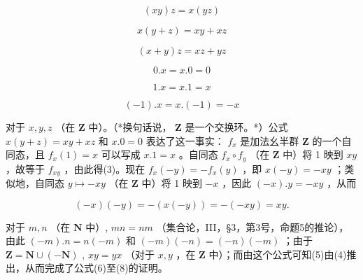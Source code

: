 \[
(x y) z = x (y z)\tag{3}
\]

\[
x (y + z) = x y + x z\tag{4}
\]

\[
(x + y) z = x z + y z\tag{5}
\]

\[
0. x = x. 0 = 0\tag{6}
\]

\[
1. x = x. 1 = x\tag{7}
\]

\[
(- 1). x = x. (- 1) = - x\tag{8}
\]

对于 \(x, y, z\) （在 \(\mathbf{Z}\) 中）。（*换句话说， \(\mathbf{Z}\) 是一个交换环。*）公式 \(x(y + z) = xy + xz\) 和 \(x.0 = 0\) 表达了这一事实： \(f_x\) 是加法幺半群 \(\mathbf{Z}\) 的一个自同态，且 \(f_{x}(1) = x\) 可以写成 \(x.1 = x\) 。自同态 \(f_{x} \circ f_{y}\) （在 \(\mathbf{Z}\) 中）将 1 映到 \(xy\) ，故等于 \(f_{xy}\) ，由此得(3)。现在 \(f_{x}(-y) = -f_{x}(y)\) ，即 \(x(-y) = -xy\) ；类似地，自同态 \(y \mapsto -xy\) （在 \(\mathbf{Z}\) 中）将 1 映到 \(-x\) ，因此 \((-x).y = -xy\) ，从而

\[
(- x) (- y) = - (x (- y)) = - (- x y) = x y.
\]

对于 \(m, n\) （在 \(\mathbf{N}\) 中）, \(mn = nm\) （集合论，III，§3，第3号，命题5的推论），由此 \((-m).n = n(-m)\) 和 \((-m)(-n) = (-n)(-m)\) ；由于 \(\mathbf{Z} = \mathbf{N} \cup (-\mathbf{N})\) , \(xy = yx\) （对于 \(x, y\) ，在 \(\mathbf{Z}\) 中）；而由这个公式可知(5)由(4)推出，从而完成了公式(6)至(8)的证明。

